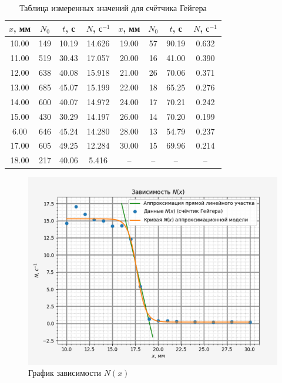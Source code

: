 \documentclass[a4paper, 12pt]{article}%
\begin{document}
    \begin{table}[h!]
        \centering
        \begin{tabular}{|c|c|c|c|c|c|c|c|}
        \hline
        $x$, мм & $N_0$ & $t$, с & $N$, $\text{с}^{-1}$ & $x$, мм & $N_0$ & $t$, с & $N$, $\text{с}^{-1}$ \\ \hline
        10.00   & 149 & 10.19  & 14.626                 & 19.00   & 57  & 90.19  & 0.632                  \\ \hline
        11.00   & 519 & 30.43  & 17.057                 & 20.00   & 16  & 41.00  & 0.390                  \\ \hline
        12.00   & 638 & 40.08  & 15.918                 & 21.00   & 26  & 70.06  & 0.371                  \\ \hline
        13.00   & 685 & 45.07  & 15.199                 & 22.00   & 18  & 65.25  & 0.276                  \\ \hline
        14.00   & 600 & 40.07  & 14.972                 & 24.00   & 17  & 70.21  & 0.242                  \\ \hline
        15.00   & 430 & 30.29  & 14.197                 & 26.00   & 14  & 70.20  & 0.199                  \\ \hline
        6.00    & 646 & 45.24  & 14.280                 & 28.00   & 13  & 54.79  & 0.237                  \\ \hline
        17.00   & 605 & 49.25  & 12.284                 & 30.00   & 15  & 69.96  & 0.214                  \\ \hline
        18.00   & 217 & 40.06  & 5.416                  & --      & --  & --     & --                     \\ \hline
        \end{tabular}
        \caption{Таблица измеренных значений для счётчика Гейгера}
    \end{table}

    \begin{figure}[!h]
        \centering
        \includegraphics[width = 14 cm]{method1.png}
        \caption{График зависимости $N(x)$}
        \label{}
    \end{figure}
\end{document}
